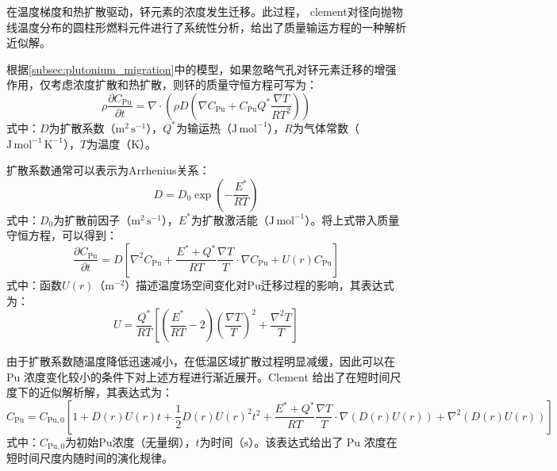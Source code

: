 \label{sec:analytical_solution}
在温度梯度和热扩散驱动，钚元素的浓度发生迁移。此过程， clement\cite{c.f.AnalyticSolutionsMass1977}对径向抛物线温度分布的圆柱形燃料元件进行了系统性分析，给出了质量输运方程的一种解析近似解。

根据\ref{subsec:plutonium_migration}中的模型，如果忽略气孔对钚元素迁移的增强作用，仅考虑浓度扩散和热扩散，则钚的质量守恒方程可写为：
\begin{equation}
	\rho \frac{\partial C_{\mathrm{Pu}}}{\partial t} = \nabla \cdot \left(\rho D\left(\nabla C_{\mathrm{Pu}} + C_{\mathrm{Pu}} Q^{*}\frac{\nabla T}{RT^{2}}\right)\right)
\end{equation}
\noindent 式中：$D$为扩散系数（$\mathrm{m^2\,s^{-1}}$），$Q^{*}$为输运热（$\mathrm{J\,mol^{-1}}$），$R$为气体常数（$\mathrm{J\,mol^{-1}\,K^{-1}}$），$T$为温度（$\mathrm{K}$）。

扩散系数通常可以表示为Arrhenius关系：
\begin{equation}
	D = D_0 \exp\left(-\frac{E^{*}}{RT}\right)
\end{equation}
\noindent 式中：$D_0$为扩散前因子（$\mathrm{m^2\,s^{-1}}$），$E^{*}$为扩散激活能（$\mathrm{J\,mol^{-1}}$）。将上式带入质量守恒方程，可以得到：
\begin{equation}
	\frac{\partial C_{\mathrm{Pu}}}{\partial t}
	=
	D
	\left[
	\nabla^{2}C_{\mathrm{Pu}}
	+
	\frac{E^{*}+Q^{*}}{RT}
	\frac{\nabla T}{T}\cdot\nabla C_{\mathrm{Pu}}
	+
	U(r)C_{\mathrm{Pu}}
	\right]
\end{equation}
\noindent 式中：函数$U(r)$（$\mathrm{m^{-2}}$）描述温度场空间变化对Pu迁移过程的影响，其表达式为：
\begin{equation}
	U =
	\frac{Q^{*}}{RT}
	\left[
	\left(\frac{E^{*}}{RT}-2\right)\left(\frac{\nabla T}{T}\right)^2
	+
	\frac{\nabla^2T}{T}
	\right]
\end{equation}

由于扩散系数随温度降低迅速减小，在低温区域扩散过程明显减缓，因此可以在 Pu 浓度变化较小的条件下对上述方程进行渐近展开。Clement 给出了在短时间尺度下的近似解析解，其表达式为：
\begin{equation}
	C_{\mathrm{Pu}} =
	C_{\mathrm{Pu},0}
	\left[
	1
	+
	D(r)U(r)t
	+
	\frac{1}{2}D(r)U(r)^2 t^2
	+
	\frac{E^{*}+Q^{*}}{RT}
	\frac{\nabla T}{T}
	\cdot
	\nabla(D(r)U(r))
	+
	\nabla^{2}(D(r)U(r))
	\right]
\end{equation}
\noindent 式中：$C_{\mathrm{Pu},0}$为初始Pu浓度（无量纲），$t$为时间（$\mathrm{s}$）。该表达式给出了 Pu 浓度在短时间尺度内随时间的演化规律。

